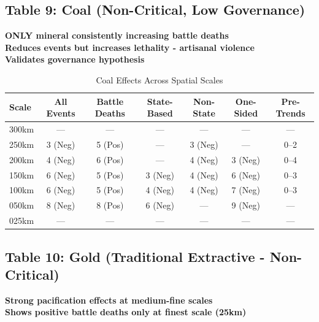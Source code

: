 \documentclass[11pt]{article}
\begin{document}
\clearpage

\subsection{Table 9: Coal (Non-Critical, Low Governance)}

\textbf{ONLY mineral consistently increasing battle deaths}\\
\textbf{Reduces events but increases lethality - artisanal violence}\\
\textbf{Validates governance hypothesis}

\begin{table}[H]
\centering
\caption{Coal Effects Across Spatial Scales}
\begin{tabular}{lcccccc}
\toprule
Scale & All Events & Battle Deaths & State-Based & Non-State & One-Sided & Pre-Trends \\
\midrule
300km & ---       & ---           & ---         & ---       & ---       & ---        \\
250km & 3 (Neg)   & 5 (Pos)       & ---         & 3 (Neg)   & ---       & 0--2       \\
200km & 4 (Neg)   & 6 (Pos)       & ---         & 4 (Neg)   & 3 (Neg)   & 0--4       \\
150km & 6 (Neg)   & 5 (Pos)       & 3 (Neg)     & 4 (Neg)   & 6 (Neg)   & 0--3       \\
100km & 6 (Neg)   & 5 (Pos)       & 4 (Neg)     & 4 (Neg)   & 7 (Neg)   & 0--3       \\
050km & 8 (Neg)   & 8 (Pos)       & 6 (Neg)     & ---       & 9 (Neg)   & ---        \\
025km & ---       & ---           & ---         & ---       & ---       & ---        \\
\bottomrule
\end{tabular}
\end{table}

\subsection{Table 10: Gold (Traditional Extractive - Non-Critical)}

\textbf{Strong pacification effects at medium-fine scales}\\
\textbf{Shows positive battle deaths only at finest scale (25km)}
\end{document}
